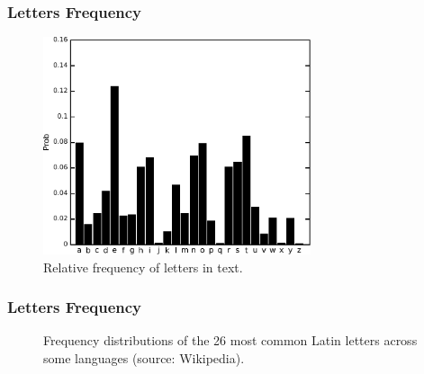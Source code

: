 \documentclass[notes]{beamer}
\begin{document}
\frame
{
  \frametitle{Letters Frequency}
  \begin{figure}[h!]
  \centering
  \includegraphics[width=0.7\textwidth]{images/ulysses_letters_prob_bargraph.pdf}
  \caption{Relative frequency of letters in text.}
  \label{fig:ulysses_letters_prob_bargraph}
  \end{figure} 
}


\frame
{
  \frametitle{Letters Frequency}
  \begin{figure}[h!]
  \caption{Frequency distributions of the 26 most common Latin letters across some languages (source: Wikipedia).}
  \label{fig:letters_freq}
  \end{figure} 
}
\end{document}
